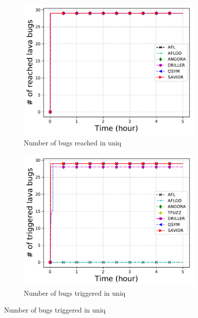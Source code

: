 \begin{figure}[htb]
\begin{subfigure}[b]{0.24\textwidth}
    \end{subfigure}\\
    \begin{subfigure}[b]{0.24\textwidth}
        \centering
        \includegraphics[width=1\textwidth]{savior/figures/lava_uniq_bugcov.pdf}
        \caption{\scriptsize{Number of bugs reached in uniq}}
        \label{fig:eval:lava:uniq}
    \end{subfigure}
    \begin{subfigure}[b]{0.24\textwidth}
        \centering
        \includegraphics[width=1\textwidth]{savior/figures/lava_uniq.pdf}
        \caption{\scriptsize{Number of bugs triggered in uniq}}
        \label{fig:eval:lava:base64}

\end{subfigure}
\end{figure}

